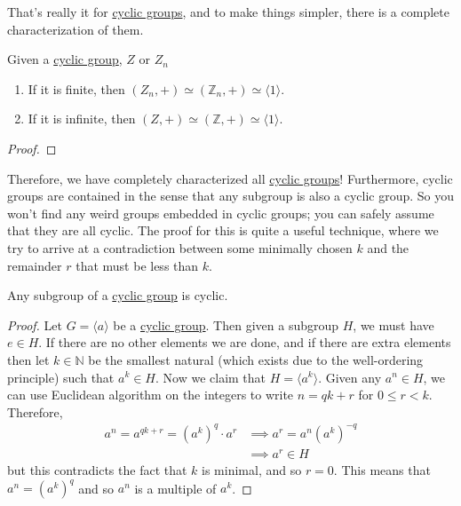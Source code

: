   That's really it for \hyperref[def:cyclic-group]{cyclic groups}, and to make things simpler, there is a complete characterization of them. 

  \begin{theorem}
    \label{thm:cyclic-groups-are-unique-up-to-order}
    Given a \hyperref[def:cyclic-group]{cyclic group}, $Z$ or $Z_n$ 
    \begin{enumerate}
      \item If it is finite, then $(Z_n, +) \simeq (\mathbb{Z}_n, +) \simeq \langle 1 \rangle$. 
      \item If it is infinite, then $(Z, +) \simeq (\mathbb{Z}, +) \simeq \langle 1 \rangle$. 
    \end{enumerate}
  \end{theorem}
  \begin{proof}
    
  \end{proof} 

  Therefore, we have completely characterized all \hyperref[def:cyclic-group]{cyclic groups}! Furthermore, cyclic groups are contained in the sense that any subgroup is also a cyclic group. So you won't find any weird groups embedded in cyclic groups; you can safely assume that they are all cyclic. The proof for this is quite a useful technique, where we try to arrive at a contradiction between some minimally chosen $k$ and the remainder $r$ that must be less than $k$. 

  \begin{theorem}
    \label{thm:subgroups-of-cyclic-groups}
    Any subgroup of a \hyperref[def:cyclic-group]{cyclic group} is cyclic. 
  \end{theorem}
  \begin{proof}
    Let $G = \langle a \rangle$ be a \hyperref[def:cyclic-group]{cyclic group}. Then given a subgroup $H$, we must have $e \in H$. If there are no other elements we are done, and if there are extra elements then let $k \in \mathbb{N}$ be the smallest natural (which exists due to the well-ordering principle) such that $a^k \in H$. Now we claim that $H = \langle a^k \rangle$. Given any $a^n \in H$, we can use Euclidean algorithm on the integers to write $n = qk + r$ for $0 \leq r < k$. Therefore, 
    \begin{align}
      a^n = a^{qk + r} = (a^k)^q \cdot a^r & \implies a^r = a^n (a^k)^{-q} \\
                                           & \implies a^r \in H 
    \end{align}
    but this contradicts the fact that $k$ is minimal, and so $r = 0$. This means that $a^n = (a^k)^q$ and so $a^n$ is a multiple of $a^k$. 
  \end{proof}

